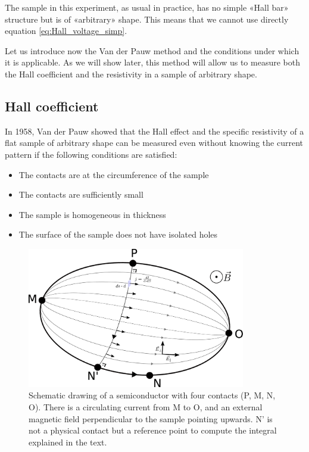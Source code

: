 \documentclass[11pt,a4paper]{article}
\begin{document}
The sample in this experiment, as usual in practice, has no simple «Hall bar» structure but is of «arbitrary» shape. This means that we cannot use directly equation \eqref{eq:Hall_voltage_simp}.

Let us introduce now the Van der Pauw method and the conditions under which it is applicable. As we will show later, this method will allow us to measure both the Hall coefficient and the resistivity in a sample of arbitrary shape.

\subsection{Hall coefficient}
In 1958, Van der Pauw \cite{vdP} showed that the Hall effect and the specific resistivity of a flat sample of arbitrary shape can be measured even without knowing the current pattern if the following conditions are satisfied:
\begin{itemize}
\item The contacts are at the circumference of the sample
\item The contacts are sufficiently small
\item The sample is homogeneous in thickness
\item The surface of the sample does not have isolated holes
\end{itemize}

\begin{figure}[ht]
\centering
\includegraphics[width=0.85\textwidth]{Drawing.eps}
\caption{Schematic drawing of a semiconductor with four contacts (P, M, N, O). There is a circulating current from M to O, and an external magnetic field perpendicular to the sample pointing upwards. N' is not a physical contact but a reference point to compute the integral explained in the text.}
\label{fig:sample}
\end{figure}
\end{document}
